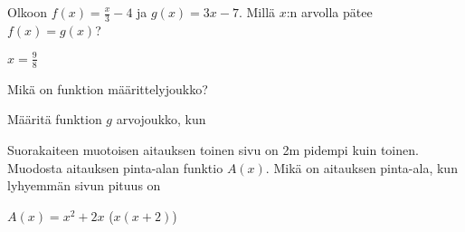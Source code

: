 \begin{tehtavasivu}
\begin{tehtava}
  Olkoon $f(x)=\frac{x}{3}-4$ ja $g(x)=3x-7$. Millä $ x $:n arvolla pätee $ f(x)=g(x)$?
  \begin{vastaus}
$ x=\frac{9}{8} $
  \end{vastaus}
\end{tehtava}

\begin{tehtava}
  Mikä on funktion määrittelyjoukko?
  \begin{alakohdat}
  \end{alakohdat}

\end{tehtava}

\begin{tehtava}
	Määritä funktion $g$ arvojoukko, kun
	\begin{alakohdat}
	\end{alakohdat}
\end{tehtava}


\begin{tehtava}
  Suorakaiteen muotoisen aitauksen toinen sivu on 2m pidempi kuin toinen.
  Muodosta aitauksen pinta-alan funktio $A(x)$.
  Mikä on aitauksen pinta-ala, kun lyhyemmän sivun pituus on
  \begin{alakohdat}
  \end{alakohdat}

  \begin{vastaus}
    $A(x) = x^2 + 2x$ ($x(x+2)$)
      \begin{alakohdat}
      \end{alakohdat}
  \end{vastaus}
\end{tehtava}


\end{tehtavasivu}

